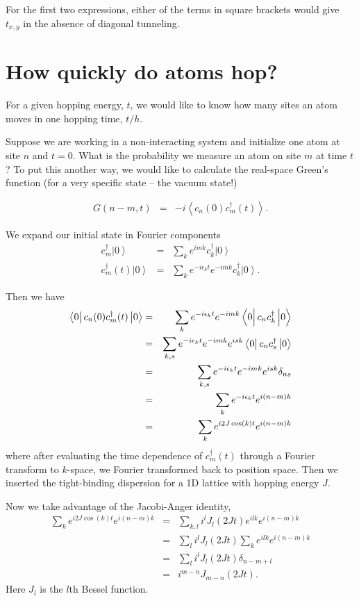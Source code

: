 \documentclass{article}
\newcommand{\ensavg}[1]{\left< #1 \right>} %
\newcommand{\ket}[1]{\left| #1 \right>} %
\newcommand{\matrixel}[3]{\left< #1 \vphantom{#2#3} \right|
 #2 \left| #3 \vphantom{#1#2} \right>} %
\theoremstyle{definition}
\begin{document}
For the first two expressions, either of the terms in square brackets would give $t_{x,y}$ in the absence of diagonal tunneling.

\section{How quickly do atoms hop?}

For a given hopping energy, $t$, we would like to know how many sites an atom moves in one hopping time, $t/h$.

Suppose we are working in a non-interacting system and initialize one atom at site $n$ and $t=0$. What is the probability we measure an atom on site $m$ at time $t$? To put this another way, we would like to calculate the real-space Green's function (for a very specific state -- the vacuum state!)

\begin{eqnarray}
G(n-m, t) &=& -i \ensavg{c_n(0)c^\dag_m(t)}.
\end{eqnarray}

We expand our initial state in Fourier components
\begin{eqnarray}
c^\dag_m \ket{0} &=& \sum_k e^{imk} c^\dag_k \ket{0}\\
c^\dag_m(t) \ket{0} &=& \sum_k e^{-i \epsilon_k t} e^{-imk} c^\dag_k \ket{0}.
\end{eqnarray}

Then we have
\begin{eqnarray}
\matrixel{0}{c_n(0)c^\dag_m(t)}{0} &=& \sum_k e^{-i \epsilon_k t} e^{-imk} \matrixel{0}{c_nc^\dag_k }{0}\\
&=& \sum_{k,s} e^{-i \epsilon_k t} e^{-imk}e^{isk} \matrixel{0}{c_nc^\dag_s }{0}\\
&=& \sum_{k,s} e^{-i \epsilon_k t} e^{-imk}e^{isk} \delta_{ns} \\
&=& \sum_k e^{-i \epsilon_k t} e^{i(n-m)k}\\
&=& \sum_k e^{i 2J\cos(k) t} e^{i(n-m)k}
\end{eqnarray}
where after evaluating the time dependence of $c^\dag_m(t)$ through a Fourier transform to $k$-space, we Fourier transformed back to position space. Then we inserted the tight-binding dispersion for a 1D lattice with hopping energy $J$.

Now we take advantage of the Jacobi-Anger identity,
\begin{eqnarray}
\sum_k e^{i 2J\cos(k) t} e^{i(n-m)k} &=& \sum_{k,l}i^l J_l(2Jt)e^{ilk} e^{i(n-m)k}\\
&=& \sum_l i^l J_l(2Jt) \sum_k e^{ilk} e^{i(n-m)k}\\
&=& \sum_l i^l J_l(2Jt) \delta_{n-m+l}\\
&=& i^{m-n} J_{m-n}(2Jt).
\end{eqnarray}
Here $J_l$ is the $l$th Bessel function.
\end{document}
